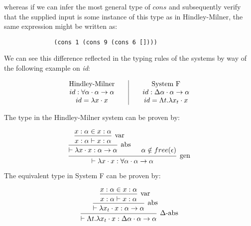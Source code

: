 \documentclass{ProgressReport}[2020/09/15]
\begin{document}
            whereas if we can infer the most general type of $cons$ and
            subsequently verify that the supplied input is some instance of this
            type as in Hindley-Milner, the same expression might be written as:
            
            \begin{verbatim}
              (cons 1 (cons 9 (cons 6 [])))  
            \end{verbatim}
            
            We can see this difference reflected in the typing rules of the
            systems by way of the following example on \emph{id}:
            
            \[\begin{array}{c@{\qquad}|@{\qquad}c}
                  \mbox{Hindley-Milner}
                  &
                  \mbox{System F}
                  \\
                  id : \forall \alpha \cdot \alpha \to \alpha
                  &
                  id : \Delta \alpha \cdot \alpha \to \alpha
                  \\                  id = \lambda x \cdot x
                  &
                  id = \Lambda t . \lambda x_t \cdot x
            \end{array} \]
            
            The type in the Hindley-Milner system can be proven by:
            
            
            \[\begin{array}{c}
            \mbox{\begin{prooftree}
                    \hypo{x : \alpha \in x : \alpha}   
                  \infer1[var]{x : \alpha \vdash x : \alpha}
                \infer1[abs]{\vdash \lambda x \cdot x : \alpha \to \alpha}
                \hypo{\alpha \notin free(\epsilon)}
               \infer2[gen]{\vdash \lambda x \cdot x : \forall \alpha \cdot
               \alpha \to \alpha}
            \end{prooftree}}
            \end{array} \]
            
            
            The equivalent type in System F can be proven by:
            
            \[\begin{array}{c}
            \mbox{\begin{prooftree}
                  \hypo{x : \alpha \in x : \alpha}
                \infer1[var]{x : \alpha \vdash x : \alpha}
               \infer1[abs]{\vdash \lambda x_t \cdot x : \alpha \to \alpha}
               \infer1[$\Delta$-abs]{\vdash \Lambda t . \lambda x_t \cdot
                 x : \Delta \alpha \cdot \alpha \to \alpha}
            \end{prooftree}}
            \end{array} \]
            
\end{document}
